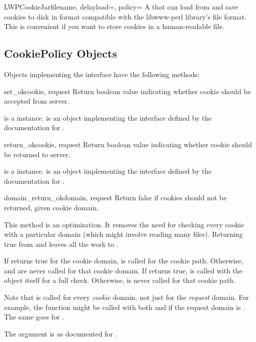 \begin{classdesc}{LWPCookieJar}{filename, delayload=,
 policy=}
A  that can load from and save cookies to disk in
format compatible with the libwww-perl library's 
file format.  This is convenient if you want to store cookies in a
human-readable file.
\end{classdesc}


\subsection{CookiePolicy Objects \label{cookie-policy-objects}}

Objects implementing the  interface have the
following methods:

\begin{methoddesc}[CookiePolicy]{set_ok}{cookie, request}
Return boolean value indicating whether cookie should be accepted from server.

 is a  instance.   is
an object implementing the interface defined by the documentation for
.
\end{methoddesc}

\begin{methoddesc}[CookiePolicy]{return_ok}{cookie, request}
Return boolean value indicating whether cookie should be returned to server.

 is a  instance.   is
an object implementing the interface defined by the documentation for
.
\end{methoddesc}

\begin{methoddesc}[CookiePolicy]{domain_return_ok}{domain, request}
Return false if cookies should not be returned, given cookie domain.

This method is an optimization.  It removes the need for checking
every cookie with a particular domain (which might involve reading
many files).  Returning true from  and
 leaves all the work to .

If  returns true for the cookie domain,
 is called for the cookie path.  Otherwise,
 and  are never called
for that cookie domain.  If  returns true,
 is called with the  object itself
for a full check.  Otherwise,  is never called for
that cookie path.

Note that  is called for every
\emph{cookie} domain, not just for the \emph{request} domain.  For
example, the function might be called with both 
and  if the request domain is
.  The same goes for
.

The  argument is as documented for .
\end{methoddesc}

